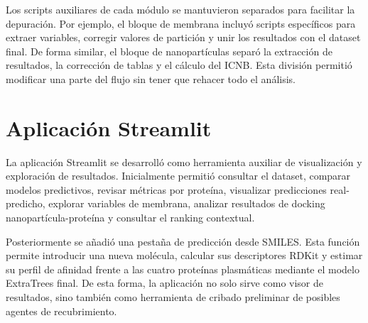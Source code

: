 \documentclass[
  spanish,
  a4paper,
  12pt,
  oneside,
  openany]{memoir}
\begin{document}
\endgroup

Los scripts auxiliares de cada módulo se mantuvieron separados para
facilitar la depuración. Por ejemplo, el bloque de membrana incluyó
scripts específicos para extraer variables, corregir valores de
partición y unir los resultados con el dataset final. De forma similar,
el bloque de nanopartículas separó la extracción de resultados, la
corrección de tablas y el cálculo del ICNB. Esta división permitió
modificar una parte del flujo sin tener que rehacer todo el análisis.

\section{Aplicación Streamlit}

La aplicación Streamlit se desarrolló como herramienta auxiliar de
visualización y exploración de resultados. Inicialmente permitió
consultar el dataset, comparar modelos predictivos, revisar métricas por
proteína, visualizar predicciones real-predicho, explorar variables de
membrana, analizar resultados de docking nanopartícula-proteína y
consultar el ranking contextual.

Posteriormente se añadió una pestaña de predicción desde SMILES. Esta
función permite introducir una nueva molécula, calcular sus descriptores
RDKit y estimar su perfil de afinidad frente a las cuatro proteínas
plasmáticas mediante el modelo ExtraTrees final. De esta forma, la
aplicación no solo sirve como visor de resultados, sino también como
herramienta de cribado preliminar de posibles agentes de recubrimiento.
\end{document}
